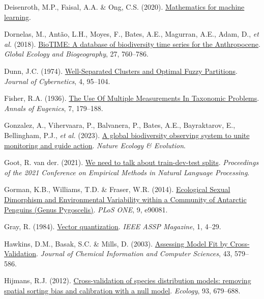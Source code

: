 \documentclass[
  letterpaper,
]{scrbook}
\newlength{\cslhangindent}
\newenvironment{CSLReferences}[2] %
 {\begin{list}{}{%
  \setlength{\itemindent}{0pt}
  \setlength{\leftmargin}{0pt}
  \setlength{\parsep}{0pt}
  \ifodd #1
   \setlength{\leftmargin}{\cslhangindent}
   \setlength{\itemindent}{-1\cslhangindent}
  \fi
  \setlength{\itemsep}{#2\baselineskip}}}
 {\end{list}}
\begin{document}
\begin{CSLReferences}{1}{0}
Deisenroth, M.P., Faisal, A.A. \& Ong, C.S. (2020).
\href{https://doi.org/10.1017/9781108679930}{Mathematics for machine
learning}.

Dornelas, M., Antão, L.H., Moyes, F., Bates, A.E., Magurran, A.E., Adam,
D., \emph{et al.} (2018).
\href{https://doi.org/10.1111/geb.12729}{BioTIME: A database of
biodiversity time series for the Anthropocene}. \emph{Global Ecology and
Biogeography}, 27, 760--786.

Dunn, J.C. (1974).
\href{https://doi.org/10.1080/01969727408546059}{Well-Separated Clusters
and Optimal Fuzzy Partitions}. \emph{Journal of Cybernetics}, 4,
95--104.

Fisher, R.A. (1936).
\href{https://doi.org/10.1111/j.1469-1809.1936.tb02137.x}{The Use Of
Multiple Measurements In Taxonomic Problems}. \emph{Annals of Eugenics},
7, 179--188.

Gonzalez, A., Vihervaara, P., Balvanera, P., Bates, A.E., Bayraktarov,
E., Bellingham, P.J., \emph{et al.} (2023).
\href{https://doi.org/10.1038/s41559-023-02171-0}{A global biodiversity
observing system to unite monitoring and guide action}. \emph{Nature
Ecology \& Evolution}.

Goot, R. van der. (2021).
\href{https://doi.org/10.18653/v1/2021.emnlp-main.368}{We need to talk
about train-dev-test splits}. \emph{Proceedings of the 2021 Conference
on Empirical Methods in Natural Language Processing}.

Gorman, K.B., Williams, T.D. \& Fraser, W.R. (2014).
\href{https://doi.org/10.1371/journal.pone.0090081}{Ecological Sexual
Dimorphism and Environmental Variability within a Community of Antarctic
Penguins (Genus Pygoscelis)}. \emph{PLoS ONE}, 9, e90081.

Gray, R. (1984).
\href{https://doi.org/10.1109/massp.1984.1162229}{Vector quantization}.
\emph{IEEE ASSP Magazine}, 1, 4--29.

Hawkins, D.M., Basak, S.C. \& Mills, D. (2003).
\href{https://doi.org/10.1021/ci025626i}{Assessing Model Fit by
Cross-Validation}. \emph{Journal of Chemical Information and Computer
Sciences}, 43, 579--586.

Hijmans, R.J. (2012).
\href{https://doi.org/10.1890/11-0826.1}{Cross-validation of species
distribution models: removing spatial sorting bias and calibration with
a null model}. \emph{Ecology}, 93, 679--688.


\end{CSLReferences}
\end{document}
